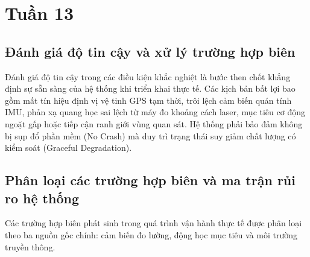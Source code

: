\section{Tuần 13}

\subsection{Đánh giá độ tin cậy và xử lý trường hợp biên}

\hspace{0.5cm} Đánh giá độ tin cậy trong các điều kiện khắc nghiệt là bước then chốt khẳng định sự sẵn sàng của hệ thống khi triển khai thực tế. Các kịch bản bất lợi bao gồm mất tín hiệu định vị vệ tinh GPS tạm thời, trôi lệch cảm biến quán tính IMU, phản xạ quang học sai lệch từ máy đo khoảng cách laser, mục tiêu cơ động ngoặt gấp hoặc tiếp cận ranh giới vùng quan sát. Hệ thống phải bảo đảm không bị sụp đổ phần mềm (No Crash) mà duy trì trạng thái suy giảm chất lượng có kiểm soát (Graceful Degradation).

\subsection{Phân loại các trường hợp biên và ma trận rủi ro hệ thống}

\hspace{0.5cm} Các trường hợp biên phát sinh trong quá trình vận hành thực tế được phân loại theo ba nguồn gốc chính: cảm biến đo lường, động học mục tiêu và môi trường truyền thông.

\begin{table}[H]
\centering
\caption{Phân loại các trường hợp biên theo nguồn gốc và mức độ nghiêm trọng}
\label{tab:edge-cases}
\end{table}

